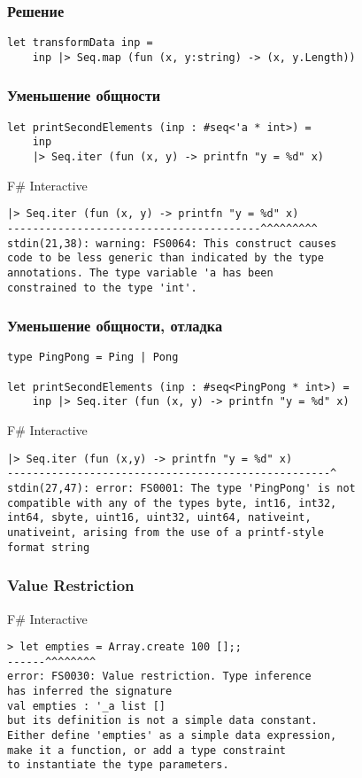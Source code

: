 \documentclass[xetex,mathserif,serif]{beamer}
\begin{document}
	\begin{frame}[fragile]
		\frametitle{Решение}
		\begin{verbatim}
let transformData inp =
    inp |> Seq.map (fun (x, y:string) -> (x, y.Length))
		\end{verbatim}
	\end{frame}

	\begin{frame}[fragile]
		\frametitle{Уменьшение общности}
		\begin{verbatim}
let printSecondElements (inp : #seq<'a * int>) =
    inp
    |> Seq.iter (fun (x, y) -> printfn "y = %d" x)
		\end{verbatim}

		\begin{alertblock}{F\# Interactive}
			\begin{verbatim}
|> Seq.iter (fun (x, y) -> printfn "y = %d" x)
----------------------------------------^^^^^^^^^
stdin(21,38): warning: FS0064: This construct causes 
code to be less generic than indicated by the type 
annotations. The type variable 'a has been 
constrained to the type 'int'.
			\end{verbatim}
		\end{alertblock}
	\end{frame}

	\begin{frame}[fragile]
		\frametitle{Уменьшение общности, отладка}
		\begin{verbatim}
type PingPong = Ping | Pong

let printSecondElements (inp : #seq<PingPong * int>) =
    inp |> Seq.iter (fun (x, y) -> printfn "y = %d" x)
		\end{verbatim}

		\begin{alertblock}{F\# Interactive}
			\begin{verbatim}
|> Seq.iter (fun (x,y) -> printfn "y = %d" x)
---------------------------------------------------^
stdin(27,47): error: FS0001: The type 'PingPong' is not 
compatible with any of the types byte, int16, int32, 
int64, sbyte, uint16, uint32, uint64, nativeint, 
unativeint, arising from the use of a printf-style 
format string
			\end{verbatim}
		\end{alertblock}
	\end{frame}

	\begin{frame}[fragile]
		\frametitle{Value Restriction}
		\begin{alertblock}{F\# Interactive}
			\begin{verbatim}
> let empties = Array.create 100 [];;
------^^^^^^^^
error: FS0030: Value restriction. Type inference 
has inferred the signature 
val empties : '_a list []
but its definition is not a simple data constant. 
Either define 'empties' as a simple data expression, 
make it a function, or add a type constraint 
to instantiate the type parameters.
			\end{verbatim}
		\end{alertblock}
	\end{frame}
\end{document}

